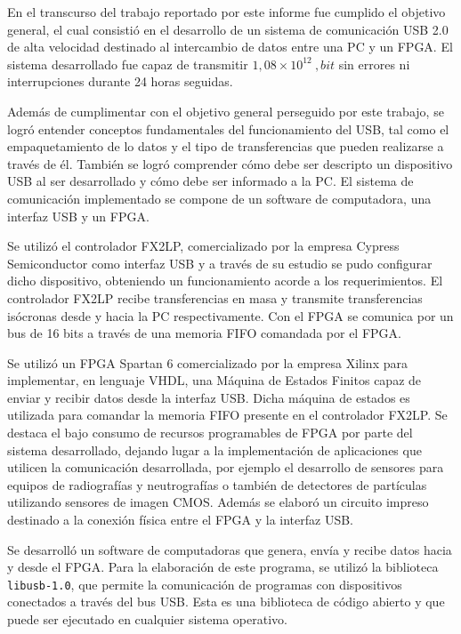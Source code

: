 En el transcurso del trabajo reportado por este informe fue cumplido el objetivo general, el cual consistió en el desarrollo de un sistema de comunicación USB 2.0 de alta velocidad destinado al intercambio de datos entre una PC y un FPGA. El sistema desarrollado fue capaz de transmitir $1,08 \times 10^{12} \ ,bit$ sin errores ni interrupciones durante 24 horas seguidas.

Además de cumplimentar con el objetivo general perseguido por este trabajo, se logró entender conceptos fundamentales del funcionamiento del USB, tal como el empaquetamiento de lo datos y el tipo de transferencias que pueden realizarse a través de él. También se logró comprender cómo debe ser descripto un dispositivo USB al ser desarrollado y cómo debe ser informado a la PC. El sistema de comunicación implementado se compone de un software de computadora, una interfaz USB y un FPGA.

Se utilizó el controlador FX2LP, comercializado por la empresa Cypress Semiconductor como interfaz USB y a través de su estudio se pudo configurar dicho dispositivo, obteniendo un funcionamiento acorde a los requerimientos. El controlador FX2LP recibe transferencias en masa y transmite transferencias isócronas desde y hacia la PC respectivamente. Con el FPGA se comunica por un bus de 16 bits a través de una memoria FIFO comandada por el FPGA.

Se utilizó un FPGA Spartan 6 comercializado por la empresa Xilinx para implementar, en lenguaje VHDL, una Máquina de Estados Finitos capaz de enviar y recibir datos desde la interfaz USB. Dicha máquina de estados es utilizada para comandar la memoria FIFO presente en el controlador FX2LP. Se destaca el bajo consumo de recursos programables de FPGA por parte del sistema desarrollado, dejando lugar a la implementación de aplicaciones que utilicen la comunicación desarrollada, por ejemplo el desarrollo de sensores para equipos de radiografías y neutrografías o también de detectores de partículas utilizando sensores de imagen CMOS. Además se elaboró un circuito impreso destinado a la conexión física entre el FPGA y la interfaz USB.

Se desarrolló un software de computadoras que genera, envía y recibe datos hacia y desde el FPGA. Para la elaboración de este programa, se utilizó la biblioteca \verb|libusb-1.0|, que permite la comunicación de programas con dispositivos conectados a través del bus USB. Esta es una biblioteca de código abierto y que puede ser ejecutado en cualquier sistema operativo.

